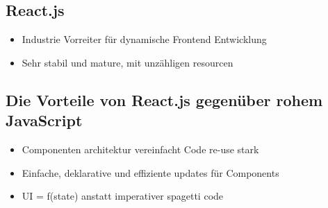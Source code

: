 \subsection{React.js}

\begin{itemize}
  \item Industrie Vorreiter für dynamische Frontend Entwicklung
  \item Sehr stabil und mature, mit unzähligen resourcen
\end{itemize}

\subsection{Die Vorteile von React.js gegenüber rohem JavaScript}

\begin{itemize}
  \item Componenten architektur vereinfacht Code re-use stark
  \item Einfache, deklarative und effiziente updates für Components
  \item UI = f(state) anstatt imperativer spagetti code
\end{itemize}
